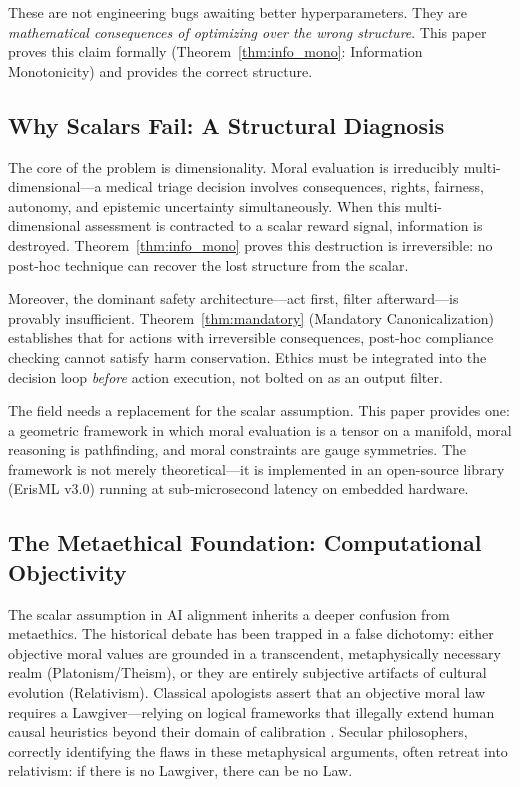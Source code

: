 \documentclass[12pt,letterpaper]{article}
\theoremstyle{definition}
\theoremstyle{remark}
\begin{document}
These are not engineering bugs awaiting better hyperparameters. They are \emph{mathematical consequences of optimizing over the wrong structure}. This paper proves this claim formally (Theorem~\ref{thm:info_mono}: Information Monotonicity) and provides the correct structure.

\subsection{Why Scalars Fail: A Structural Diagnosis}

The core of the problem is dimensionality. Moral evaluation is irreducibly multi-dimensional---a medical triage decision involves consequences, rights, fairness, autonomy, and epistemic uncertainty simultaneously. When this multi-dimensional assessment is contracted to a scalar reward signal, information is destroyed. Theorem~\ref{thm:info_mono} proves this destruction is irreversible: no post-hoc technique can recover the lost structure from the scalar.

Moreover, the dominant safety architecture---act first, filter afterward---is provably insufficient. Theorem~\ref{thm:mandatory} (Mandatory Canonicalization) establishes that for actions with irreversible consequences, post-hoc compliance checking cannot satisfy harm conservation. Ethics must be integrated into the decision loop \emph{before} action execution, not bolted on as an output filter.

The field needs a replacement for the scalar assumption. This paper provides one: a geometric framework in which moral evaluation is a tensor on a manifold, moral reasoning is pathfinding, and moral constraints are gauge symmetries. The framework is not merely theoretical---it is implemented in an open-source library (ErisML v3.0) running at sub-microsecond latency on embedded hardware.

\subsection{The Metaethical Foundation: Computational Objectivity}

The scalar assumption in AI alignment inherits a deeper confusion from metaethics. The historical debate has been trapped in a false dichotomy: either objective moral values are grounded in a transcendent, metaphysically necessary realm (Platonism/Theism), or they are entirely subjective artifacts of cultural evolution (Relativism). Classical apologists assert that an objective moral law requires a Lawgiver---relying on logical frameworks that illegally extend human causal heuristics beyond their domain of calibration \cite{bond2026pragmatist}. Secular philosophers, correctly identifying the flaws in these metaphysical arguments, often retreat into relativism: if there is no Lawgiver, there can be no Law.
\end{document}
